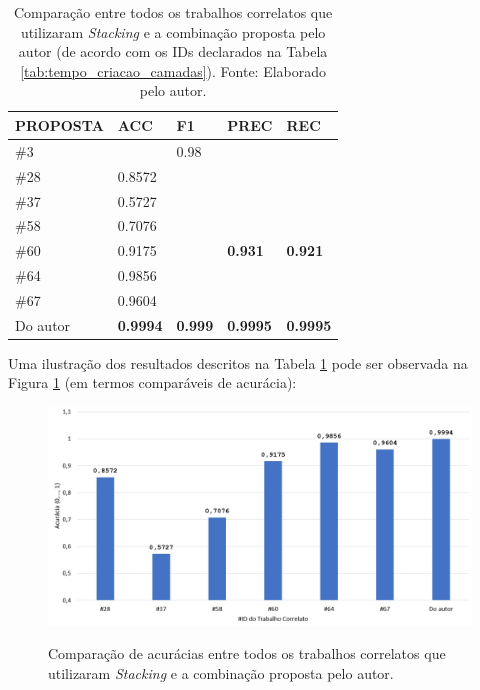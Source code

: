\begin{longtable}{l|l|l|l|l}
\caption{Comparação entre todos os trabalhos correlatos que utilizaram \textit{Stacking} e a combinação proposta pelo autor (de acordo com os IDs declarados na Tabela \ref{tab:tempo_criacao_camadas}). Fonte: Elaborado pelo autor.}

\label{tab:todos_resultados}

\hline

\textbf{PROPOSTA} & \textbf{ACC} & \textbf{F1} & \textbf{PREC} & \textbf{REC} \\ \hline \hline
\#3      &          & 0.98     &           &        \\ \hline
\#28     & 0.8572   &          &           &        \\ \hline
\#37     & 0.5727   &          &           &        \\ \hline
\#58     & 0.7076   &          &           &        \\ \hline
\#60     & 0.9175   &          & \textbf{0.931}     & \textbf{0.921}  \\ \hline
\#64     & 0.9856   &          &           &        \\ \hline
\#67     & 0.9604   &          &           &        \\ \hline
Do autor & \textbf{0.9994}   & \textbf{0.999}    &      \textbf{0.9995}     &      \textbf{0.9995}  \\ \hline


\end{longtable}

Uma ilustração dos resultados descritos na Tabela \ref{tab:todos_resultados} pode ser observada na Figura \ref{fig:comparacao_outros_Stackings} (em termos comparáveis de acurácia):






\begin{figure}[H]
\centering
\caption{Comparação de acurácias entre todos os trabalhos correlatos que utilizaram \textit{Stacking} e a combinação proposta pelo autor.}
\includegraphics[width=\textwidth,keepaspectratio]{figs/comparacao_outros_Stackings.png}
\newline {}\label{fig:comparacao_outros_Stackings}
\end{figure}



